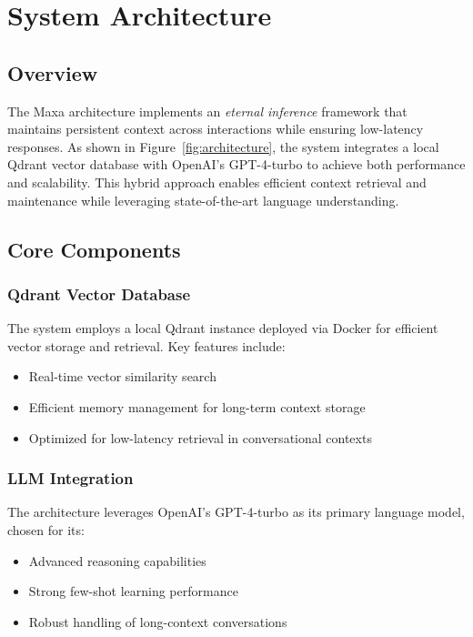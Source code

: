 \section{System Architecture}
\label{sec:architecture}

\subsection{Overview}
The Maxa architecture implements an \textit{eternal inference} framework that maintains persistent context across interactions while ensuring low-latency responses. As shown in Figure~\ref{fig:architecture}, the system integrates a local Qdrant vector database with OpenAI's GPT-4-turbo to achieve both performance and scalability. This hybrid approach enables efficient context retrieval and maintenance while leveraging state-of-the-art language understanding.

\subsection{Core Components}

\subsubsection{Qdrant Vector Database}
The system employs a local Qdrant instance deployed via Docker for efficient vector storage and retrieval. Key features include:
\begin{itemize}
    \item Real-time vector similarity search
    \item Efficient memory management for long-term context storage
    \item Optimized for low-latency retrieval in conversational contexts
\end{itemize}

\subsubsection{LLM Integration}
The architecture leverages OpenAI's GPT-4-turbo as its primary language model, chosen for its:
\begin{itemize}
    \item Advanced reasoning capabilities
    \item Strong few-shot learning performance
    \item Robust handling of long-context conversations
\end{itemize}

